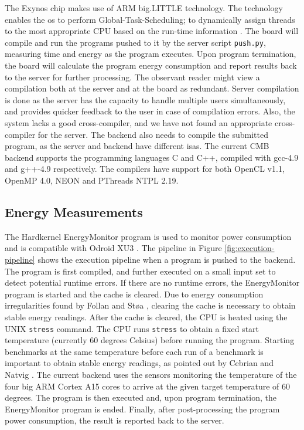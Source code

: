 The Exynos chip makes use of ARM big.LITTLE technology. The technology enables the \gls{os} to perform Global-Task-Scheduling; to dynamically assign threads to the most appropriate CPU based on the run-time information \cite{ABL}. The board will compile and run the programs pushed to it by the server script \texttt{push.py}, measuring time and energy as the program executes. Upon program termination, the board will calculate the program energy consumption and report results back to the server for further processing. The observant reader might view a compilation both at the server and at the board as redundant. Server compilation is done as the server has the capacity to handle multiple users simultaneously, and provides quicker feedback to the user in case of compilation errors. Also, the system lacks a good cross-compiler, and we have not found an appropriate cross-compiler for the server. The backend also needs to compile the submitted program, as the server and backend have different \gls{isa}s. The current CMB backend supports the programming languages C and C++, compiled with gcc-4.9 and g++-4.9 respectively. The compilers have support for both OpenCL v1.1, OpenMP 4.0, NEON and PThreads NTPL 2.19.


\subsection{Energy Measurements}
\label{sec:em-cmb}
The Hardkernel EnergyMonitor program is used to monitor power consumption and is compatible with Odroid XU3 \cite{OEM}. The pipeline in Figure \ref{fig:execution-pipeline} shows the execution pipeline when a program is pushed to the backend. The program is first compiled, and further executed on a small input set to detect potential runtime errors. If there are no runtime errors, the EnergyMonitor program is started and the cache is cleared. Due to energy consumption irregularities found by Follan and Støa \cite{mt:T&S}, clearing the cache is necessary to obtain stable energy readings. After the cache is cleared, the CPU is heated using the UNIX \texttt{stress} \cite{STRESS} command. The CPU runs \texttt{stress} to obtain a fixed start temperature (currently 60 degrees Celsius) before running the program. Starting benchmarks at the same temperature before each run of a benchmark is important to obtain stable energy readings, as pointed out by Cebrian and Natvig \cite{a:JL:T}. The current backend uses the sensors monitoring the temperature of the four big ARM Cortex A15 cores to arrive at the given target temperature of 60 degrees. The program is then executed and, upon program termination, the EnergyMonitor program is ended. Finally, after post-processing the program power consumption, the result is reported back to the server. \\

